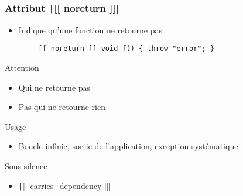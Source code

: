 \documentclass[C++.tex]{subfiles}
\begin{document}
\begin{frame}[fragile]
	\frametitle{Attribut \texttt|[[ noreturn ]]|}
	\begin{itemize}
		\item Indique qu'une fonction ne retourne pas
	\end{itemize}

	\begin{verbatim}
		[[ noreturn ]] void f() { throw "error"; }
	\end{verbatim}

	\begin{alertblock}{Attention}
		\begin{itemize}
			\item Qui ne retourne pas
			\item Pas qui ne retourne rien
		\end{itemize}
	\end{alertblock}

	\begin{block}{Usage}
		\begin{itemize}
			\item Boucle infinie, sortie de l'application, exception systématique
		\end{itemize}
	\end{block}

	\begin{block}{Sous silence}
		\begin{itemize}
			\item \texttt|[[ carries_dependency ]]|
		\end{itemize}
	\end{block}
\end{frame}
\end{document}
